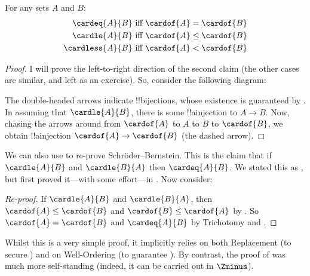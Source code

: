 \documentclass[../../../include/open-logic-section]{subfiles}
\begin{document}
\begin{lem}For any sets $A$ and $B$:
		\begin{align*}
			\cardeq{A}{B} &\text{ iff }\cardof{A} = \cardof{B}\\
			\cardle{A}{B} &\text{ iff }\cardof{A} \leq \cardof{B}\\
			\cardless{A}{B}&\text{ iff }\cardof{A} < \cardof{B}
		\end{align*}
\end{lem}
	\begin{proof}
	I will prove the left-to-right direction of the second claim (the other cases are similar, and left as an exercise). So, consider the following diagram:
	\begin{center}
	\end{center}
	The double-headed arrows indicate !!{bijection}s, whose existence is guaranteed by . In assuming that $\cardle{A}{B}$, there is some !!a{injection} to $A\to B$. Now, chasing the arrows around from $\cardof{A}$ to $A$ to $B$ to $\cardof{B}$, we obtain !!a{injection} $\cardof{A} \to \cardof{B}$ (the dashed arrow). 
\end{proof}\noindent
We can also use  to re-prove Schr\"{o}der--Bernstein. This is the claim that if $\cardle{A}{B}$ and $\cardle{B}{A}$ then $\cardeq{A}{B}$. We stated this as , but first proved it---with some effort---in . Now consider:
\begin{proof}[Re-proof]
	If $\cardle{A}{B}$ and $\cardle{B}{A}$, then $\cardof{A} \leq \cardof{B}$ and $\cardof{B} \leq \cardof{A}$ by . So $\cardof{A} = \cardof{B}$ and $\cardeq{A}{B}$ by Trichotomy and .
\end{proof}\noindent
Whilst this is a very simple proof, it implicitly relies on both Replacement (to secure ) and on Well-Ordering (to guarantee ). By contrast, the proof of  was  much more self-standing (indeed, it can be carried out in $\Zminus$).
\end{document}
